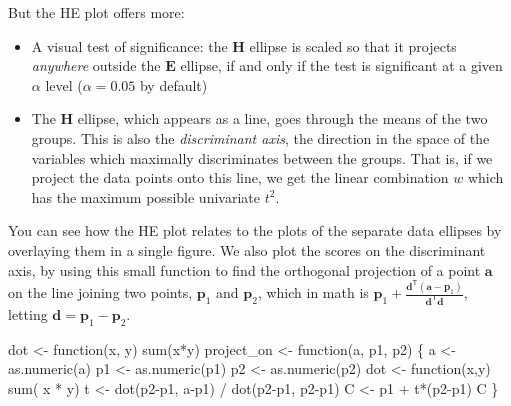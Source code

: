 \documentclass[
  letterpaper,
  10pt,
  krantz2]{krantz}
\makeatletter
\newenvironment{Shaded}{\begin{snugshade}}{\end{snugshade}}
\newcommand{\ControlFlowTok}[1]{\textcolor[rgb]{0.00,0.23,0.31}{#1}}
\newcommand{\FunctionTok}[1]{\textcolor[rgb]{0.28,0.35,0.67}{#1}}
\newcommand{\NormalTok}[1]{\textcolor[rgb]{0.00,0.23,0.31}{#1}}
\newcommand{\OtherTok}[1]{\textcolor[rgb]{0.00,0.23,0.31}{#1}}
\newcommand{\SpecialCharTok}[1]{\textcolor[rgb]{0.37,0.37,0.37}{#1}}
\newenvironment{kframe}{%
  \medskip{}
  \setlength{\fboxsep}{.8em}
  \def\at@end@of@kframe{}%
  \ifinner\ifhmode%
  \def\at@end@of@kframe{\end{minipage}}%
  \begin{minipage}{\columnwidth}%
  \fi\fi%
  \def\FrameCommand##1{\hskip\@totalleftmargin \hskip-\fboxsep
  \colorbox{shadecolor}{##1}\hskip-\fboxsep
      \hskip-\linewidth \hskip-\@totalleftmargin \hskip\columnwidth}%
  \MakeFramed {\advance\hsize-\width
    \@totalleftmargin\z@ \linewidth\hsize
    \@setminipage}}%
{\par\unskip\endMakeFramed%
  \at@end@of@kframe}
\renewenvironment{Shaded}{\begin{kframe}}{\end{kframe}}
\makeatother
\begin{document}
But the HE plot offers more:

\begin{itemize}
\item
  A visual test of significance: the \(\mathbf{H}\) ellipse is scaled so
  that it projects \emph{anywhere} outside the \(\mathbf{E}\) ellipse,
  if and only if the test is significant at a given \(\alpha\) level
  (\(\alpha = 0.05\) by default)
\item
  The \(\mathbf{H}\) ellipse, which appears as a line, goes through the
  means of the two groups. This is also the \emph{discriminant axis},
  the direction in the space of the variables which maximally
  discriminates between the groups. That is, if we project the data
  points onto this line, we get the linear combination \(w\) which has
  the maximum possible univariate \(t^2\).
\end{itemize}

You can see how the HE plot relates to the plots of the separate data
ellipses by overlaying them in a single figure. We also plot the scores
on the discriminant axis, by using this small function to find the
orthogonal projection of a point \(\mathbf{a}\) on the line joining two
points, \(\mathbf{p}_1\) and \(\mathbf{p}_2\), which in math is
\(\mathbf{p}_1 + \frac{\mathbf{d}^\mathsf{T} (\mathbf{a} - \mathbf{p}_1)} {\mathbf{d}^\mathsf{T} \mathbf{d}}\),
letting \(\mathbf{d} = \mathbf{p}_1 - \mathbf{p}_2\).

\begin{Shaded}
\begin{Highlighting}[]
\NormalTok{dot }\OtherTok{\textless{}{-}} \ControlFlowTok{function}\NormalTok{(x, y) }\FunctionTok{sum}\NormalTok{(x}\SpecialCharTok{*}\NormalTok{y)}
\NormalTok{project\_on }\OtherTok{\textless{}{-}} \ControlFlowTok{function}\NormalTok{(a, p1, p2) \{}
\NormalTok{    a }\OtherTok{\textless{}{-}} \FunctionTok{as.numeric}\NormalTok{(a)}
\NormalTok{    p1 }\OtherTok{\textless{}{-}} \FunctionTok{as.numeric}\NormalTok{(p1)}
\NormalTok{    p2 }\OtherTok{\textless{}{-}} \FunctionTok{as.numeric}\NormalTok{(p2)}
\NormalTok{    dot }\OtherTok{\textless{}{-}} \ControlFlowTok{function}\NormalTok{(x,y) }\FunctionTok{sum}\NormalTok{( x }\SpecialCharTok{*}\NormalTok{ y)    }
\NormalTok{    t }\OtherTok{\textless{}{-}} \FunctionTok{dot}\NormalTok{(p2}\SpecialCharTok{{-}}\NormalTok{p1, a}\SpecialCharTok{{-}}\NormalTok{p1) }\SpecialCharTok{/} \FunctionTok{dot}\NormalTok{(p2}\SpecialCharTok{{-}}\NormalTok{p1, p2}\SpecialCharTok{{-}}\NormalTok{p1)}
\NormalTok{    C }\OtherTok{\textless{}{-}}\NormalTok{ p1 }\SpecialCharTok{+}\NormalTok{ t}\SpecialCharTok{*}\NormalTok{(p2}\SpecialCharTok{{-}}\NormalTok{p1)}
\NormalTok{    C}
\NormalTok{\}}
\end{Highlighting}
\end{Shaded}
\end{document}
